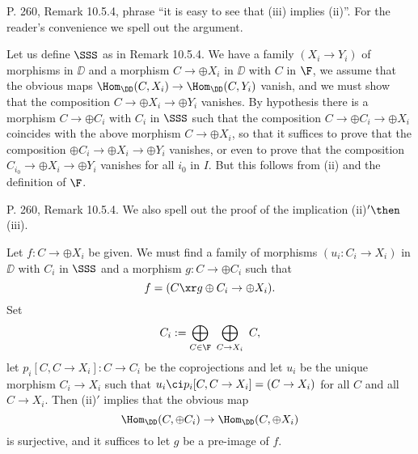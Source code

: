 \documentclass[12pt]{article}
\theoremstyle{remark}
\theoremstyle{definition}
\begin{document}
%

\begin{s}
P. 260, Remark 10.5.4, phrase ``it is easy to see that (iii) implies (ii)''. For the reader's convenience we spell out the argument. 

Let us define $\SSS$ as in Remark 10.5.4. We have a family $(X_i\to Y_i)$ of morphisms in $\DD$ and a morphism $C\to\oplus X_i$ in $\DD$ with $C$ in $\F$, we assume that the obvious maps $\Hom_\DD(C,X_i)\to\Hom_\DD(C,Y_i)$ vanish, and we must show that the composition $C\to\oplus X_i\to\oplus Y_i$ vanishes. By hypothesis there is a morphism $C\to\oplus C_i$ with $C_i$ in $\SSS$ such that the composition $C\to\oplus C_i\to\oplus X_i$ coincides with the above morphism $C\to\oplus X_i$, so that it suffices to prove that the composition $\oplus C_i\to\oplus X_i\to\oplus Y_i$ vanishes, or even to prove that the composition $C_{i_0}\to\oplus X_i\to\oplus Y_i$ vanishes for all $i_0$ in $I$. But this follows from (ii) and the definition of $\F$.
\end{s}

%

\begin{s}
P. 260, Remark 10.5.4. We also spell out the proof of the implication (ii)$'\then$(iii). 

Let $f:C\to\oplus X_i$ be given. We must find a family of morphisms $(u_i:C_i\to X_i)$ in $\DD$ with $C_i$ in $\SSS$ and a morphism $g:C\to\oplus C_i$ such that 
$$
f=(C\xr g\oplus C_i\to\oplus X_i).
$$ 
Set 
$$
C_i:=\bigoplus_{C\in\F}\ \bigoplus_{C\to X_i}\ C,
$$ 
let $p_i[C,C\to X_i]:C\to C_i$ be the coprojections and let $u_i$ be the unique morphism $C_i\to X_i$ such that $u_i\ci p_i[C,C\to X_i]=(C\to X_i)$ for all $C$ and all $C\to X_i$. Then (ii)$'$ implies that the obvious map 
$$
\Hom_\DD(C,\oplus C_i)\to\Hom_\DD(C,\oplus X_i)
$$ 
is surjective, and it suffices to let $g$ be a pre-image of $f$.
\end{s}

\end{document}
